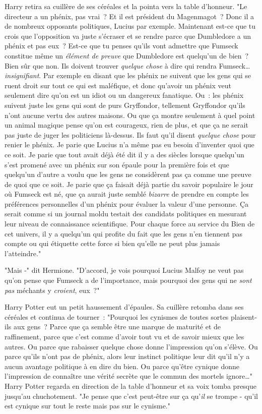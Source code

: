 Harry retira sa cuillère de ses céréales et la pointa vers la table d'honneur. "Le directeur a un phénix, pas vrai~? Et il est président du Magenmagot~? Donc il a de nombreux opposants politiques, Lucius par exemple. Maintenant est-ce que tu crois que l'opposition va juste s'écraser et se rendre parce que Dumbledore a un phénix et pas eux~? Est-ce que tu penses qu'ils vont admettre que Fumseck constitue même un \emph{élément de preuve} que Dumbledore est quelqu'un de bien~? Bien sûr que non. Ils doivent trouver \emph{quelque chose} à dire qui rendra Fumseck… \emph{insignifiant}. Par exemple en disant que les phénix ne suivent que les gens qui se ruent droit sur tout ce qui est maléfique, et donc qu'avoir un phénix veut seulement dire qu'on est un idiot ou un dangereux fanatique. Ou~: les phénix suivent juste les gens qui sont de purs Gryffondor, tellement Gryffondor qu'ils n'ont aucune vertu des autres maisons. Ou que ça montre seulement à quel point un animal magique pense qu'on est courageux, rien de plus, et que ça ne serait pas juste de juger les politiciens là-dessus. Ils faut qu'il disent \emph{quelque chose} pour renier le phénix. Je parie que Lucius n'a même pas eu besoin d'inventer quoi que ce soit. Je parie que tout avait déjà été dit il y a des siècles lorsque quelqu'un s'est promené avec un phénix sur son épaule pour la première fois et que quelqu'un d'autre a voulu que les gens ne considèrent pas ça comme une preuve de quoi que ce soit. Je parie que ça faisait déjà partie du savoir populaire le jour où Fumseck est né, que ça aurait juste semblé \emph{bizarre} de prendre en compte les préférences personnelles d'un phénix pour évaluer la valeur d'une personne. Ça serait comme si un journal moldu testait des candidats politiques en mesurant leur niveau de connaissance scientifique. Pour chaque force au service du Bien de cet univers, il y a quelqu'un qui profite du fait que les gens n'en tiennent pas compte ou qui étiquette cette force si bien qu'elle ne peut plus jamais l'atteindre."

"Mais -" dit Hermione. "D'accord, je vois pourquoi Lucius Malfoy ne veut pas qu'on pense que Fumseck a de l'importance, mais pourquoi des gens qui ne \emph{sont pas} méchants y \emph{croient}, eux~?"

Harry Potter eut un petit haussement d'épaules. Sa cuillère retomba dans ses céréales et continua de tourner~: "Pourquoi les cynismes de toutes sortes plaisent-ils aux gens~? Parce que ça semble être une marque de maturité et de raffinement, parce que c'est comme d'avoir tout vu et de savoir mieux que les autres. Ou parce que rabaisser quelque chose donne l'impression qu'on s'élève. Ou parce qu'ils n'ont pas de phénix, alors leur instinct politique leur dit qu'il n'y a aucun avantage politique à en dire du bien. Ou parce qu'être cynique donne l'impression de connaître une vérité secrète que le commun des mortels ignore…" Harry Potter regarda en direction de la table d'honneur et sa voix tomba presque jusqu'au chuchotement. "Je pense que c'est peut-être sur ça qu'\emph{il} se trompe - qu'il est cynique sur tout le reste mais pas sur le cynisme."

